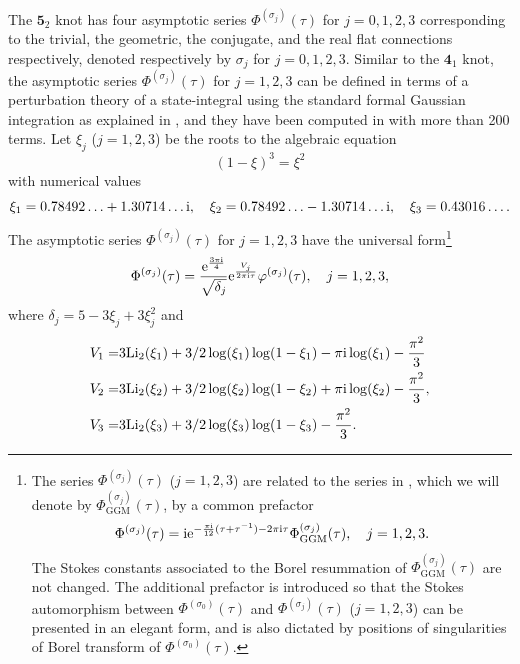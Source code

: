 \documentclass[12pt,reqno]{amsart}
\theoremstyle{definition}
\def\s{\sigma}
\def\Li{\mathrm{Li}}
\def\ri{\mathrm{i}}
\def\re{{\rm e}}
\def\ri{{\rm i}}
\def\md{\mathbf}
\newcommand{\knot}[1]{\md{#1}}
\begin{document}
The $\knot{5}_2$ knot has four asymptotic series $\Phi^{(\s_j)}(\tau)$
for $j=0,1,2,3$ corresponding to the trivial, the geometric, the
conjugate, and the real flat connections respectively, denoted
respectively by $\s_j$ for $j=0,1,2,3$.  Similar to the $\knot{4}_1$
knot, the asymptotic series $\Phi^{(\s_j)}(\tau)$ for $j=1,2,3$ can be
defined in terms of a perturbation theory of a state-integral
\cite{KLV,AK} using the standard formal Gaussian integration as
explained in \cite{DGLZ,GGM:resurgent}, and they have been computed in
\cite{GGM:resurgent} with more than 200 terms.  Let $\xi_{j}$
($j=1,2,3$) be the roots to the algebraic equation
\begin{equation}
  (1-\xi)^3 = \xi^2
\end{equation}
with numerical values
\begin{equation}
  \xi_1 = 0.78492\ldots +1.30714\ldots\ri,\quad
  \xi_2 = 0.78492\ldots -1.30714\ldots\ri,\quad
  \xi_3 = 0.43016\ldots.
  \label{eq:xi}
\end{equation}
The asymptotic series $\Phi^{(\s_j)}(\tau)$  for $j=1,2,3$ have the
universal form\footnote{The series $\Phi^{(\s_j)}(\tau)$ ($j=1,2,3$) are related
  to the series in \cite{GGM:resurgent,GGM:peacock}, which we will
  denote by $\Phi^{(\s_j)}_{\text{GGM}}(\tau)$, by a common prefactor
  \begin{equation}
    \Phi^{(\s_j)}(\tau) = \ri
    \re^{-\frac{\pi\ri}{12}(\tau+\tau^{-1})-2\pi\ri\tau}
    \Phi^{(\s_j)}_{\text{GGM}}(\tau),\quad j=1,2,3.
  \end{equation}
  The Stokes constants associated to the Borel resummation of
  $\Phi^{(\s_j)}_{\text{GGM}}(\tau)$ are not changed. The additional
  prefactor is introduced so that the Stokes automorphism between
  $\Phi^{(\s_0)}(\tau)$ and $\Phi^{(\s_j)}(\tau)$ ($j=1,2,3$) can be
  presented in an elegant form, and is also dictated by positions of
  singularities of Borel transform of $\Phi^{(\s_0)}(\tau)$.}
\begin{equation}
  \Phi^{(\s_j)}(\tau) = \frac{\re^{\frac{3\pi\ri}{4}}}{\sqrt{\delta_j}}
  \re^{\frac{V_j}{2\pi\ri\tau}}  \varphi^{(\s_j)}(\tau),\quad j=1,2,3,
\end{equation}
where $\delta_j = 5-3\xi_j+3\xi_j^2$  and
\begin{equation}
\label{eq:V52}
  \begin{aligned}
    V_1 =
    &3\Li_2(\xi_1)+3/2\log(\xi_1)\log(1-\xi_1)
      -\pi\ri\log(\xi_1)-\frac{\pi^2}{3} 
    \\
    V_2 =
    &3\Li_2(\xi_2)+3/2\log(\xi_2)\log(1-\xi_2)
      +\pi\ri\log(\xi_2)-\frac{\pi^2}{3},
    \\
    V_3 =
    &3\Li_2(\xi_3)+3/2\log(\xi_3)\log(1-\xi_3)
      -\frac{\pi^2}{3}.
  \end{aligned}  
\end{equation}
\end{document}
